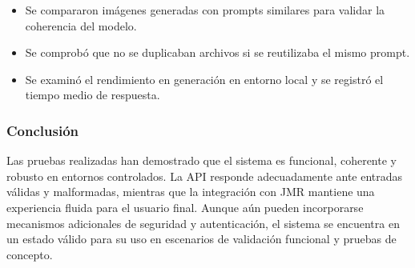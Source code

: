 \begin{itemize}
    \item Se compararon imágenes generadas con prompts similares para validar la coherencia del modelo.
    \item Se comprobó que no se duplicaban archivos si se reutilizaba el mismo prompt.
    \item Se examinó el rendimiento en generación en entorno local y se registró el tiempo medio de respuesta.
\end{itemize}

\subsubsection{Conclusión}

Las pruebas realizadas han demostrado que el sistema es funcional, coherente y robusto en entornos controlados. La API responde adecuadamente ante entradas válidas y malformadas, mientras que la integración con JMR mantiene una experiencia fluida para el usuario final. Aunque aún pueden incorporarse mecanismos adicionales de seguridad y autenticación, el sistema se encuentra en un estado válido para su uso en escenarios de validación funcional y pruebas de concepto.
